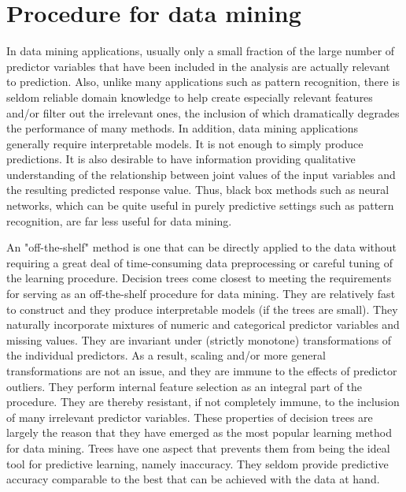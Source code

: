 \section{Procedure for data mining}
In data mining applications, usually only a small fraction of the large number of predictor variables that have been included in the analysis are actually relevant to prediction. Also, unlike many applications such as pattern recognition, there is seldom reliable domain knowledge to help create especially relevant features and/or filter out the irrelevant ones, the inclusion of which dramatically degrades the performance of many methods.
In addition, data mining applications generally require interpretable models. It is not enough to simply produce predictions. It is also desirable to have information providing qualitative understanding of the relationship between joint values of the input variables and the resulting predicted response value. Thus, black box methods such as neural networks, which can be quite useful in purely predictive settings such as pattern recognition, are far less useful for data mining.

An "off-the-shelf" method is one that can be directly applied to the data without requiring a great deal of time-consuming data preprocessing or careful tuning of the learning procedure. Decision trees come closest to meeting the requirements for serving as an off-the-shelf procedure for data mining. They are relatively fast to construct and they produce interpretable models (if the trees are small). They naturally incorporate mixtures of numeric and categorical predictor variables and missing values. They are invariant under (strictly monotone) transformations of the individual predictors. As a result, scaling and/or more general transformations are not an issue, and they are immune to the effects of predictor outliers. They perform internal feature selection as an integral part of the procedure. They are thereby resistant, if not completely immune, to the inclusion of many irrelevant predictor variables. These properties of decision trees are largely the reason that they have emerged as the most popular learning method for data mining. Trees have one aspect that prevents them from being the ideal tool for predictive learning, namely inaccuracy. They seldom provide predictive accuracy comparable to the best that can be achieved with the data at hand.

